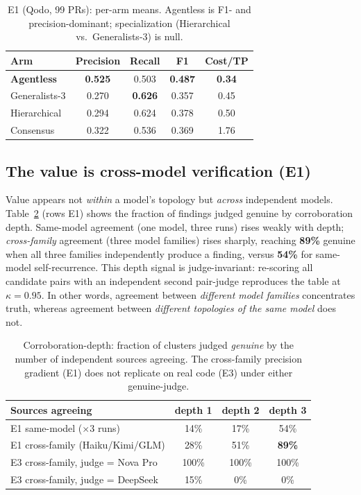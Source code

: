 \documentclass[conference]{IEEEtran}
\begin{document}
\begin{table}[t]
\caption{E1 (Qodo, 99 PRs): per-arm means. Agentless is F1- and
precision-dominant; specialization (Hierarchical vs.\ Generalists-3) is null.}
\label{tab:e1}
\centering
\begin{tabular}{@{}lcccc@{}}
\toprule
\textbf{Arm} & \textbf{Precision} & \textbf{Recall} & \textbf{F1} & \textbf{Cost/TP} \\
\midrule
\textbf{Agentless} & \textbf{0.525} & 0.503 & \textbf{0.487} & \textbf{0.34} \\
Generalists-3 & 0.270 & \textbf{0.626} & 0.357 & 0.45 \\
Hierarchical  & 0.294 & 0.624 & 0.378 & 0.50 \\
Consensus     & 0.322 & 0.536 & 0.369 & 1.76 \\
\bottomrule
\end{tabular}
\end{table}

\subsection{The value is cross-model verification (E1)}
Value appears not \emph{within} a model's topology but \emph{across} independent
models. Table~\ref{tab:depth} (rows E1) shows the fraction of findings judged
genuine by corroboration depth. Same-model agreement (one model, three runs)
rises weakly with depth; \emph{cross-family} agreement (three model families)
rises sharply, reaching \textbf{89\%} genuine when all three families
independently produce a finding, versus \textbf{54\%} for same-model
self-recurrence. This depth signal is judge-invariant: re-scoring all candidate
pairs with an independent second pair-judge reproduces the table at
$\kappa{=}0.95$. In other words, agreement between \emph{different model families}
concentrates truth, whereas agreement between \emph{different topologies of the
same model} does not.

\begin{table}[t]
\caption{Corroboration-depth: fraction of clusters judged \emph{genuine} by the
number of independent sources agreeing. The cross-family precision gradient
(E1) does not replicate on real code (E3) under either genuine-judge.}
\label{tab:depth}
\centering
\begin{tabular}{@{}lccc@{}}
\toprule
\textbf{Sources agreeing} & \textbf{depth 1} & \textbf{depth 2} & \textbf{depth 3} \\
\midrule
E1 same-model ($\times3$ runs)      & 14\% & 17\% & 54\% \\
E1 cross-family (Haiku/Kimi/GLM)    & 28\% & 51\% & \textbf{89\%} \\
\midrule
E3 cross-family, judge = Nova Pro   & 100\% & 100\% & 100\% \\
E3 cross-family, judge = DeepSeek   & 15\% & 0\% & 0\% \\
\bottomrule
\end{tabular}
\end{table}
\end{document}
